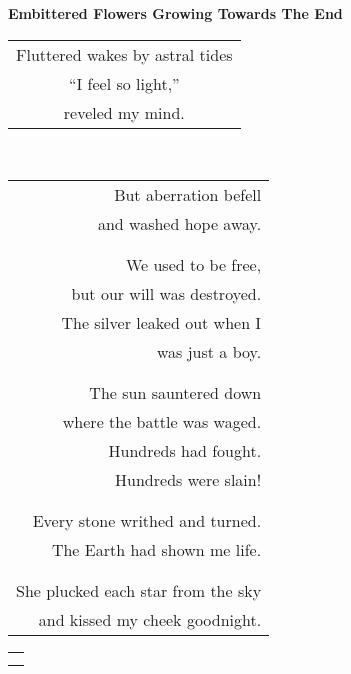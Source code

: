 \documentclass{article}
\begin{document}
\begin{center}
\textbf{Embittered Flowers Growing Towards The End} \\
\begin{tabular}{c}
\\
Fluttered wakes by astral tides \\
``I feel so light,'' \\
reveled my mind. \\
\end{tabular} \\
\begin{tabular}{r}
\\
But aberration befell \\
and washed hope away. \\
\\
\\
We used to be free, \\
but our will\hspace{2ex} was destroyed. \\
The silver leaked out\hspace{2ex} when I \\
was just a boy. \\
\\
\\
The sun sauntered down \\
where the battle was waged. \\
Hundreds had fought. \\
Hundreds were slain! \\
\\
\\
Every stone writhed and turned. \\
The Earth had shown me life. \\
\\
\\
She plucked each star from the sky \\
and kissed my cheek goodnight. \\
\end{tabular}
\begin{tabular}{l}
\\
\\
\\

\end{tabular}
\end{center}
\end{document}
